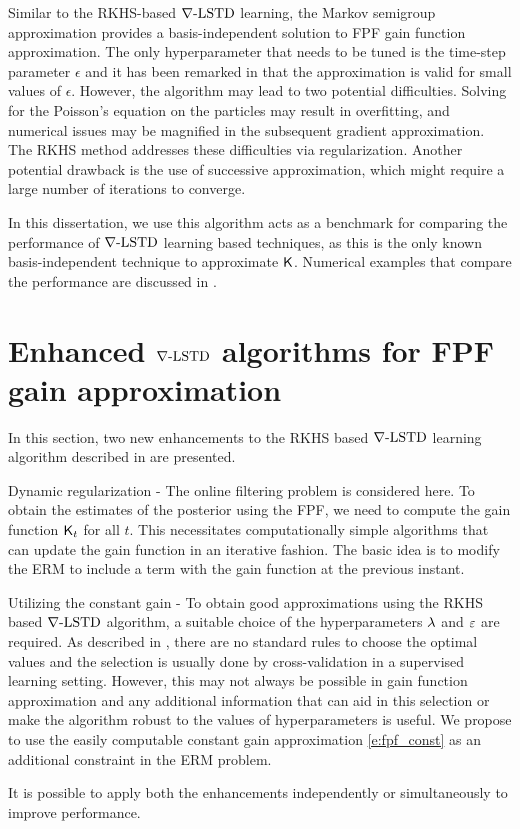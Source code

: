 Similar to the RKHS-based $\nabla\text{-LSTD}$ learning, the Markov semigroup approximation provides a basis-independent solution to FPF gain function approximation. The only hyperparameter that needs to be tuned is the time-step parameter $\epsilon$ and it has been remarked in \cite{tagmeh16} that the approximation is valid for small values of $\epsilon$. However, the algorithm may lead to two potential difficulties. Solving for the Poisson's equation on the particles may result in overfitting,  and numerical issues may be magnified in the subsequent gradient approximation. The RKHS method addresses these difficulties via regularization. Another potential drawback is the use of successive approximation, which might require a large number of iterations to converge. 

In this dissertation, we use this algorithm acts as a benchmark for comparing the performance of $\nabla\text{-LSTD}$ learning based techniques, as this is the only known basis-independent technique to approximate $\text{\sf K}$. Numerical examples that compare the performance are discussed in .


\section{Enhanced $\nabla\text{-LSTD}$ algorithms for FPF gain approximation} 
\label{s:fpf_rkhs_improvements}
In this section, two new enhancements to the RKHS based $\nabla\text{-LSTD}$ learning algorithm described in  are presented. 
\begin{romannum}
\item Dynamic regularization - The online filtering problem is considered here. To obtain the estimates of the posterior using the FPF, we need to compute the gain function $\text{\sf K}_t$ for all $t$. This necessitates computationally simple algorithms that can update the gain function in an iterative fashion. The basic idea is to modify the ERM to include a term with the gain function at the previous instant.
\item Utilizing the constant gain - To obtain good approximations using the RKHS based $\nabla\text{-LSTD}$ algorithm, a suitable choice of the hyperparameters $\lambda$ and $\varepsilon$ are required. As described in , there are no standard rules to choose the optimal values and the selection is usually done by cross-validation in a supervised learning setting. However, this may not always be possible in gain function approximation and any additional information that can aid in this selection or make the algorithm robust to the values of hyperparameters is useful. We propose to use the easily computable constant gain approximation \eqref{e:fpf_const} as an additional constraint in the ERM problem. 
\end{romannum}
It is possible to apply both the enhancements independently or simultaneously to improve performance. 

